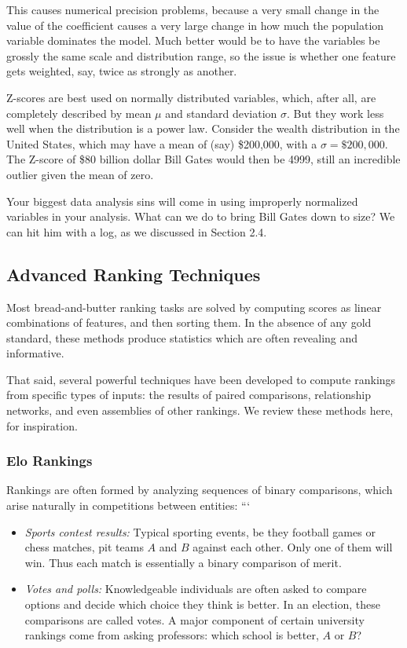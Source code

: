 \documentclass[10pt]{article}
\begin{document}
This causes numerical precision problems, because a very small change in the value of the coefficient causes a very large change in how much the population variable dominates the model. Much better would be to have the variables be grossly the same scale and distribution range, so the issue is whether one feature gets weighted, say, twice as strongly as another.

Z-scores are best used on normally distributed variables, which, after all, are completely described by mean $\mu$ and standard deviation $\sigma$. But they work less well when the distribution is a power law. Consider the wealth distribution in the United States, which may have a mean of (say) \$200,000, with a $\sigma=\$200,000$. The Z-score of \$80 billion dollar Bill Gates would then be 4999, still an incredible outlier given the mean of zero.

Your biggest data analysis sins will come in using improperly normalized variables in your analysis. What can we do to bring Bill Gates down to size? We can hit him with a log, as we discussed in Section 2.4.

\subsection{Advanced Ranking Techniques}
Most bread-and-butter ranking tasks are solved by computing scores as linear combinations of features, and then sorting them. In the absence of any gold standard, these methods produce statistics which are often revealing and informative.

That said, several powerful techniques have been developed to compute rankings from specific types of inputs: the results of paired comparisons, relationship networks, and even assemblies of other rankings. We review these methods here, for inspiration.

\subsubsection{Elo Rankings}
Rankings are often formed by analyzing sequences of binary comparisons, which arise naturally in competitions between entities:
```

\begin{itemize}
    \item \textit{Sports contest results:} Typical sporting events, be they football games or chess matches, pit teams $A$ and $B$ against each other. Only one of them will win. Thus each match is essentially a binary comparison of merit.
    \item \textit{Votes and polls:} Knowledgeable individuals are often asked to compare options and decide which choice they think is better. In an election, these comparisons are called votes. A major component of certain university rankings come from asking professors: which school is better, $A$ or $B$?
\end{itemize}
\end{document}
